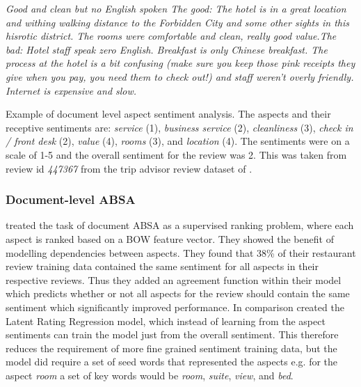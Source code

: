 
\begin{example}
\textit{Good and clean but no English spoken The good: The hotel is in a great location and withing walking distance to the Forbidden City and some other sights in this hisrotic district. The rooms were comfortable and clean, really good value.The bad: Hotel staff speak zero English. Breakfast is only Chinese breakfast. The process at the hotel is a bit confusing (make sure you keep those pink receipts they give when you pay, you need them to check out!) and staff weren't overly friendly. Internet is expensive and slow.}
\caption{Example of document level aspect sentiment analysis. The aspects and their receptive sentiments are: \textit{service} (1), \textit{business service} (2), \textit{cleanliness} (3), \textit{check in / front desk} (2), \textit{value} (4), \textit{rooms} (3), and \textit{location} (4). The sentiments were on a scale of 1-5 and the overall sentiment for the review was 2. This was taken from review id \textit{447367} from the trip advisor review dataset of \citet{Wang2010LatentAR}.}
\label{example:lit_review_document_aspect_sentiment}
\end{example}

\subsubsection{Document-level ABSA}
\label{lit_review_document_ABSA}

\citet{snyder-barzilay-2007-multiple} treated the task of document ABSA as a supervised ranking problem, where each aspect is ranked based on a BOW feature vector. They showed the benefit of modelling dependencies between aspects. They found that 38\% of their restaurant review training data contained the same sentiment for all aspects in their respective reviews. Thus they added an agreement function within their model which predicts whether or not all aspects for the review should contain the same sentiment which significantly improved performance. In comparison \citet{Wang2010LatentAR} created the Latent Rating Regression model, which instead of learning from the aspect sentiments can train the model just from the overall sentiment. This therefore reduces the requirement of more fine grained sentiment training data, but the model did require a set of seed words that represented the aspects e.g. for the aspect \textit{room} a set of key words would be \textit{room}, \textit{suite}, \textit{view}, and \textit{bed}. 

